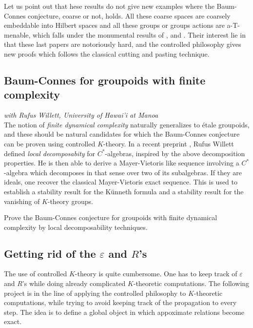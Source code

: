 Let us point out that hese results do not give new examples where the Baum-Connes conjecture, coarse or not, holds. All these coarse spaces are coarsely embeddable into Hilbert spaces and all these groups or groups actions are a-T-menable, which falls under the monumental results of \cite{HigsonKasparov}, \cite{TuThese} and \cite{Yu2}. Their interest lie in that these last papers are notoriously hard, and the controlled philosophy gives new proofs which follows the classical cutting and pasting technique.\\  

\subsection*{Baum-Connes for groupoids with finite complexity}
  
\textit{with Rufus Willett, University of Hawai'i at Manoa}\\

The notion of \textit{finite dynamical complexity} naturally generalizes to \'etale groupoids, and these should be natural candidates for which the Baum-Connes conjecture can be proven using controlled $K$-theory. In a recent preprint \cite{willett2019decompositions}, Rufus Willett defined \textit{local decomposabity} for $C^*$-algebras, inspired by the above decomposition properties. He is then able to derive a Mayer-Vietoris like sequence involving a $C^*$-algebra which decomposes in that sense over two of its subalgebras. If they are ideals, one recover the classical Mayer-Vietoris exact sequence. This is used to establish a stability result for the K\"unneth formula and a stability result for the vanishing of $K$-theory groups.\\

\begin{project}
Prove the Baum-Connes conjecture for groupoids with finite dynamical complexity by local decomposability techniques.  
\end{project} 

\subsection*{Getting rid of the $\varepsilon$ and $R$'s}

The use of controlled $K$-theory is quite cumbersome. One has to keep track of $\varepsilon $ and $R$'s while doing already complicated $K$-theoretic computations. The following project is in the line of applying the controlled philosophy to $K$-theoretic computations, while trying to avoid keeping track of the propagation to every step. The idea is to define a global object in which appoximate relations become exact. \\

